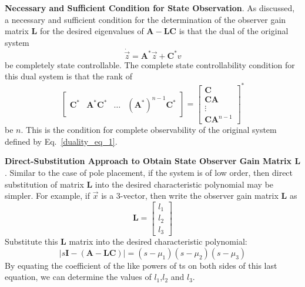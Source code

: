 \documentclass[11pt,a4paper,oneside]{book}
\numberwithin{equation}{section}
\theoremstyle{it}
\theoremstyle{definition}
\begin{document}
\vspace{5mm}
\textbf{Necessary and Sufficient Condition for State Observation}. As discussed, a necessary and sufficient condition for the determination of the observer gain matrix $\mathbf{L}$ for the desired eigenvalues of $\mathbf{A-LC}$ is that the dual of the original system
\begin{equation}\label{duality_eq_7}
	\dot{\vec z} = \mathbf{A}^*\vec z + \mathbf{C}^*v
\end{equation}
be completely state controllable. The complete state controllability condition for this dual system is that the rank of 
\begin{equation}\label{duality_eq_8}
	\begin{bmatrix}
		\mathbf{C}^* & \mathbf{A^*C^*} & \dots & (\mathbf{A}^*)^{n-1}\mathbf{C}^*
	\end{bmatrix}= 
	\begin{bmatrix}
		\mathbf{C}  \\
		\mathbf{CA} \\
		\vdots \\
		\mathbf{CA}^{n-1}
	\end{bmatrix}^*
\end{equation}
be $n$. This is the condition for complete observability of the original system 
defined by Eq.~\eqref{duality_eq_1}.

\vspace{5mm}
\textbf{Direct-Substitution Approach to Obtain State Observer Gain Matrix $\mathbf{L}$}. Similar to the case of pole placement, if the system is of low order, then direct substitution of matrix $\mathbf{L}$ into the desired characteristic polynomial may be simpler. For example, if $\vec x$ is a 3-vector, then write the observer gain matrix $\mathbf{L}$ as
\begin{equation} 
\mathbf{L}=\begin{bmatrix}
	l_1\\
	l_2\\
	l_3
\end{bmatrix}
\end{equation}
Substitute this $\mathbf{L}$ matrix into the desired characteristic polynomial:
\begin{equation} 
|s\mathbf{I-(A - LC)}|= (s-\mu_1)(s-\mu_2)(s-\mu_3)
\end{equation}
By equating the coefficient of the like powers of ts on both sides of this last equation, we can determine the values of $l_1$,$l_2$ and $l_3$.
\end{document}
